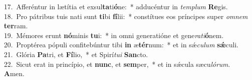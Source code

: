 {17.~}Afferéntur in lætítia et exsul\textbf{ta}ti\textbf{ó}ne:~* adducéntur in \textit{tem}\textit{plum} \textbf{Re}gis.\\
{18.~}Pro pátribus tuis nati sunt \textbf{ti}bi \textbf{fí}lii:~* constítues eos príncipes super \textit{om}\textit{nem} \textbf{ter}ram.\\
{19.~}Mémores erunt \textbf{nó}minis \textbf{tu}i:~* in omni generatióne et gene\textit{ra}\textit{ti}\textbf{ó}nem.\\
{20.~}Proptérea pópuli confitebúntur tibi \textbf{in} æ\textbf{tér}num:~* et in sǽ\textit{cu}\textit{lum} \textbf{sǽ}culi.\\
{21.~}Glória \textbf{Pa}tri, et \textbf{Fí}lio,~* et Spirí\textit{tu}\textit{i} \textbf{San}cto.\\
{22.~}Sicut erat in princípio, et \textbf{nunc}, et \textbf{sem}per,~* et in sǽcula sæcu\textit{ló}\textit{rum}. \textbf{A}men.\\
